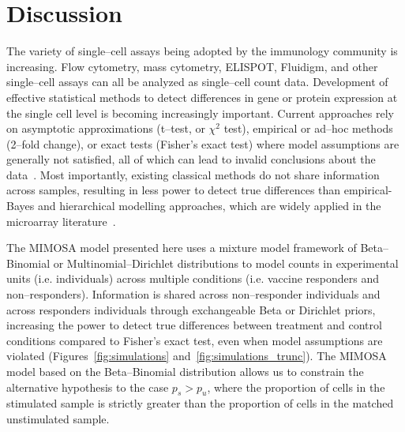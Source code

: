 \documentclass[11pt]{article}
\begin{document}
\section{Discussion}
The variety of single--cell assays being adopted by the immunology community is increasing. Flow cytometry, mass cytometry, ELISPOT, Fluidigm, and other single--cell assays can all be analyzed as single--cell count data. Development of effective statistical methods to detect differences in gene or protein expression at the single cell level is becoming increasingly important. Current approaches rely on asymptotic approximations (t--test, or $\chi^2$ test), empirical or ad--hoc methods (2--fold change), or exact tests (Fisher's exact test) where model assumptions are generally not satisfied, all of which can lead to invalid conclusions about the data~\cite{Dittrich:2012bv,Trigona:2003,Sinclair:2004hs,Horton:2007tsa,Proschan:2009ks}. Most importantly, existing classical methods do not share information across samples, resulting in less power to detect true differences than empirical-Bayes and hierarchical modelling approaches, which are widely applied in the microarray literature~\cite{Kendziorski:2003uw,Newton:2001go,Smyth:2005iy}. 

The MIMOSA model presented here uses a mixture model framework of Beta--Binomial or Multinomial--Dirichlet distributions to model counts in experimental units (i.e. individuals) across multiple conditions (i.e. vaccine responders and non--responders). Information is shared across non--responder individuals and across responders individuals through exchangeable Beta or Dirichlet priors, increasing the power to detect true differences between treatment and control conditions compared to Fisher's exact test, even when model assumptions are violated (Figures~\ref{fig:simulations} and~\ref{fig:simulations_trunc}). The MIMOSA model based on the Beta--Binomial distribution allows us to constrain the alternative hypothesis to the case $p_s > p_u$, where the proportion of cells in the stimulated sample is strictly greater than the proportion of cells in the matched unstimulated sample. 
\end{document}
